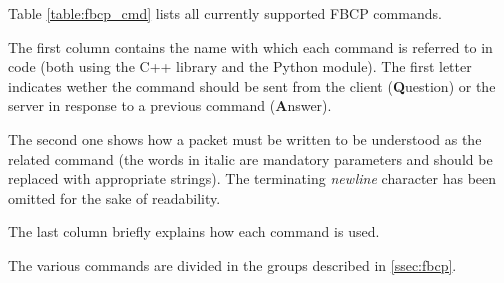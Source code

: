 Table \ref{table:fbcp_cmd} lists all currently supported FBCP commands.

The first column contains the name with which each command is referred
to in code (both using the C++ library and the Python module).
The first letter indicates wether the command should be sent from the
client (\textbf{Q}uestion) or the server in response to a previous
command (\textbf{A}nswer).

The second one shows how a packet must be written to be understood as
the related command (the words in italic are mandatory parameters and
should be replaced with appropriate strings). The terminating
\textit{newline} character has been omitted for the sake of readability.

The last column briefly explains how each command is used.

The various commands are divided in the groups described in
\ref{ssec:fbcp}.

